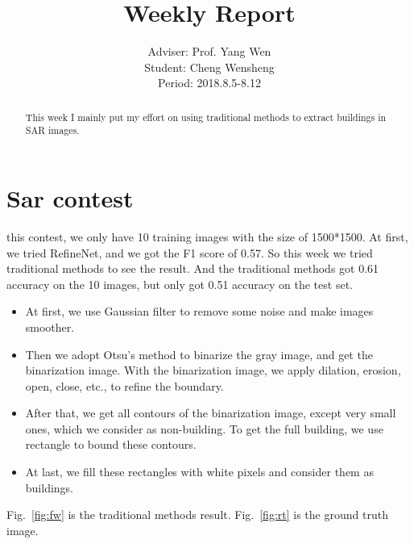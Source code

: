 \documentclass[]{IEEEtran}
\begin{document}
	\title{Weekly Report}
	\author{Adviser: Prof. Yang Wen \\Student: Cheng Wensheng\\ Period: 2018.8.5-8.12
	}
	\maketitle

\begin{abstract}
	This week I mainly put my effort on using traditional methods to extract buildings in SAR images. 
\end{abstract}

\section{Sar contest}
	 this contest, we only have 10 training images with the size of 1500*1500. At first, we tried RefineNet, and we got the F1 score of 0.57. So this week we tried traditional methods to see the result. And the traditional methods got 0.61 accuracy on the 10 images, but only got 0.51 accuracy on the test set.	
	\begin{itemize}
		\item At first, we use Gaussian filter to remove some noise and make images smoother.  
		\item Then we adopt Otsu's method to binarize the gray image, and get the binarization image. With the binarization image, we apply dilation, erosion, open, close, etc., to refine the boundary. 
		\item  After that, we get all contours of the binarization image, except very small ones, which we consider as non-building. To get the full building, we use rectangle to bound these contours.
		\item  At last, we fill these rectangles with white pixels and consider them as buildings.
	\end{itemize}
	
	Fig.~\ref{fig:fw} is the traditional methods result. Fig.~\ref{fig:rt} is the ground truth image.
	

\end{document}
